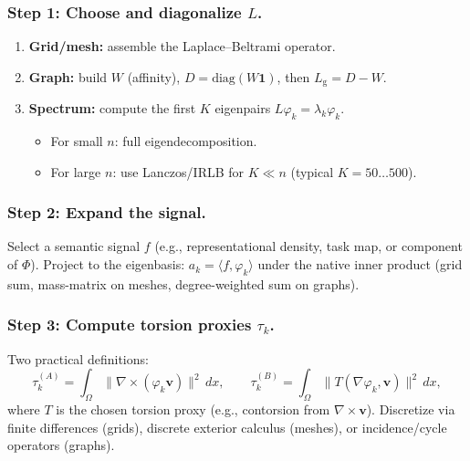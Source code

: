 \documentclass[a4paper,11pt]{article}
\begin{document}
\subsubsection{Step 1: Choose and diagonalize $L$.}
\begin{enumerate}
\item \textbf{Grid/mesh:} assemble the Laplace--Beltrami operator.
\item \textbf{Graph:} build $W$ (affinity), $D=\mathrm{diag}(W\mathbf{1})$,
then $L_{\mathrm g}=D-W$.
\item \textbf{Spectrum:} compute the first $K$ eigenpairs
$L\varphi_k=\lambda_k\varphi_k$.
  \begin{itemize}
  \item For small $n$: full eigendecomposition.
  \item For large $n$: use Lanczos/IRLB for $K\!\ll\!n$ (typical $K=50\ldots500$).
  \end{itemize}
\end{enumerate}

\subsubsection{Step 2: Expand the signal.}
Select a semantic signal $f$ (e.g., representational density, task map, or
component of $\Phi$). Project to the eigenbasis:
$a_k=\langle f,\varphi_k\rangle$ under the native inner product
(grid sum, mass-matrix on meshes, degree-weighted sum on graphs).

\subsubsection{Step 3: Compute torsion proxies $\tau_k$.}
Two practical definitions:
\begin{equation}
\tau_k^{(A)}=\int_\Omega \|\nabla\times(\varphi_k\mathbf v)\|^2\,dx,
\qquad
\tau_k^{(B)}=\int_\Omega \|T(\nabla\varphi_k,\mathbf v)\|^2\,dx,
\end{equation}
where $T$ is the chosen torsion proxy (e.g., contorsion from
$\nabla\times\mathbf v$).  
Discretize via finite differences (grids), discrete exterior calculus
(meshes), or incidence/cycle operators (graphs).
\end{document}
